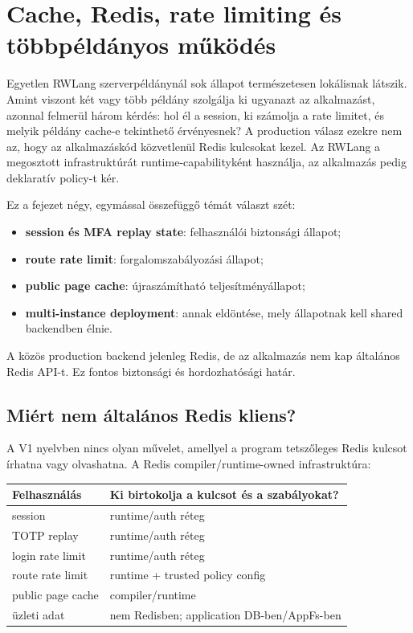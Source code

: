 \chapter{Cache, Redis, rate limiting és többpéldányos működés}

Egyetlen RWLang szerverpéldánynál sok állapot természetesen lokálisnak látszik. Amint viszont két vagy több példány szolgálja ki ugyanazt az alkalmazást, azonnal felmerül három kérdés: hol él a session, ki számolja a rate limitet, és melyik példány cache-e tekinthető érvényesnek? A production válasz ezekre nem az, hogy az alkalmazáskód közvetlenül Redis kulcsokat kezel. Az RWLang a megosztott infrastruktúrát runtime-capabilityként használja, az alkalmazás pedig deklaratív policy-t kér.

Ez a fejezet négy, egymással összefüggő témát választ szét:

\begin{itemize}
  \item \textbf{session és MFA replay state}: felhasználói biztonsági állapot;
  \item \textbf{route rate limit}: forgalomszabályozási állapot;
  \item \textbf{public page cache}: újraszámítható teljesítményállapot;
  \item \textbf{multi-instance deployment}: annak eldöntése, mely állapotnak kell shared backendben élnie.
\end{itemize}

A közös production backend jelenleg Redis, de az alkalmazás nem kap általános Redis API-t. Ez fontos biztonsági és hordozhatósági határ.

\section{Miért nem általános Redis kliens?}

A V1 nyelvben nincs olyan művelet, amellyel a program tetszőleges Redis kulcsot írhatna vagy olvashatna. A Redis compiler/runtime-owned infrastruktúra:

\begin{center}
\begin{tabularx}{\textwidth}{@{}L{0.27\textwidth}Y@{}}
\toprule
\textbf{Felhasználás} & \textbf{Ki birtokolja a kulcsot és a szabályokat?} \\
\midrule
session & runtime/auth réteg \\
TOTP replay & runtime/auth réteg \\
login rate limit & runtime/auth réteg \\
route rate limit & runtime + trusted policy config \\
public page cache & compiler/runtime \\
üzleti adat & nem Redisben; application DB-ben/AppFs-ben \\
\bottomrule
\end{tabularx}
\end{center}

